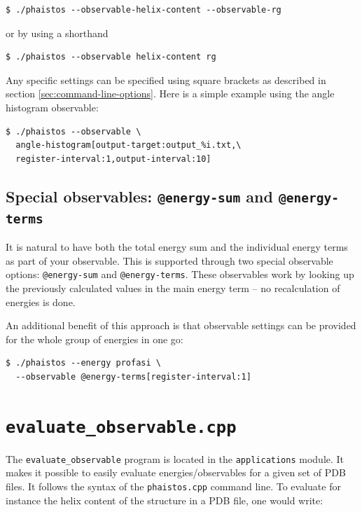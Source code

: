 \documentclass[11pt,a4paper,twoside]{book}
\begin{document}
\begin{verbatim}
$ ./phaistos --observable-helix-content --observable-rg
\end{verbatim}

\noindent
or by using a shorthand

\begin{verbatim}
$ ./phaistos --observable helix-content rg
\end{verbatim}

\noindent
Any specific settings can be specified using square brackets as
described in section \ref{sec:command-line-options}. Here is a simple
example using the angle histogram observable:

\begin{verbatim}
$ ./phaistos --observable \
  angle-histogram[output-target:output_%i.txt,\
  register-interval:1,output-interval:10]
\end{verbatim}

\subsection{Special observables: \texttt{@energy-sum} and \texttt{@energy-terms}}
\label{sec:energy-sum-energy}

It is natural to have both the total energy sum and the individual
energy terms as part of your observable. This is supported through two
special observable options: \texttt{@energy-sum} and
\texttt{@energy-terms}. These observables work by looking up the
previously calculated values in the main energy term -- no
recalculation of energies is done.

An additional benefit of this approach is that observable settings can
be provided for the whole group of energies in one go:

\begin{verbatim}
$ ./phaistos --energy profasi \
  --observable @energy-terms[register-interval:1]
\end{verbatim}



\section{\texttt{evaluate\_observable.cpp}}
\label{sec:evaluate-observable}

The \texttt{evaluate\_observable} program is located in the
\texttt{applications} module. It makes it possible to easily evaluate
energies/observables for a given set of PDB files. It follows the
syntax of the \texttt{phaistos.cpp} command line. To evaluate for
instance the helix content of the structure in a PDB file, one would
write:
\end{document}
